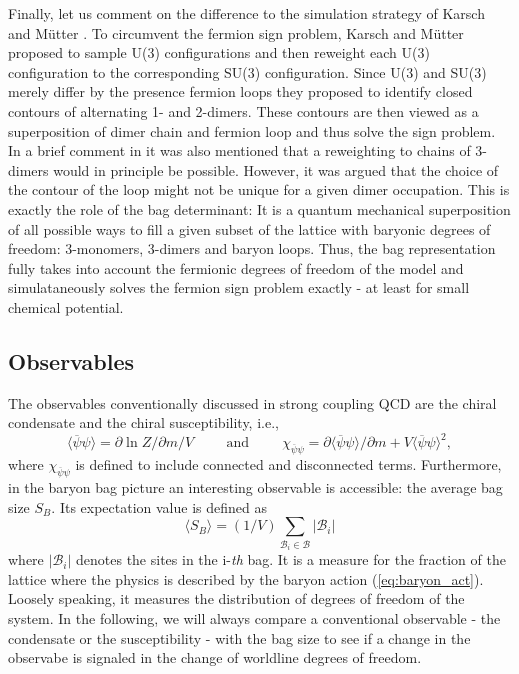\documentclass{PoS}
\begin{document}
Finally, let us comment on the difference to the simulation strategy of Karsch and M\"utter \cite{Karsch:1988zx}. To circumvent the fermion sign problem, Karsch and M\"utter proposed to sample U(3) configurations and then reweight each U(3) configuration to the corresponding SU(3) configuration. Since U(3) and SU(3) merely differ by the presence fermion loops they proposed to identify closed contours of alternating 1- and 2-dimers. These contours are then viewed as a superposition of dimer chain and fermion loop and thus solve the sign problem. In a brief comment in \cite{Karsch:1988zx} it was also mentioned that a reweighting to chains of 3-dimers would in principle be possible. However, it was argued that the choice of the contour of the loop might not be unique for a given dimer occupation. This is exactly the role of the bag determinant: It is a quantum mechanical superposition of all possible ways to fill a given subset of the lattice with baryonic degrees of freedom: 3-monomers, 3-dimers and baryon loops. Thus, the bag representation fully takes into account the fermionic degrees of freedom of the model and simulataneously solves the fermion sign problem exactly - at least for small chemical potential.

\subsection{Observables}

The observables conventionally discussed in strong coupling QCD are the chiral condensate and the chiral susceptibility, i.e.,
\begin{equation}
\langle \overline{\psi}\psi \rangle = \partial \ln Z/\partial m / V \hspace{1cm} \text{and} \hspace{1cm} \chi_{\overline{\psi}\psi} = \partial \langle\overline{\psi}\psi\rangle/\partial m + V\langle \overline{\psi}\psi \rangle^2,
\end{equation}
where $ \chi_{\overline{\psi}\psi}$ is defined to include connected and disconnected terms. Furthermore, in the baryon bag picture an interesting observable is accessible: the average bag size $S_B$. Its expectation value is defined as
\begin{equation}
\langle S_B \rangle = (1/V) \sum_{\mathcal{B}_i \in \mathcal{B}} |\mathcal{B}_i|
\end{equation}
where $|\mathcal{B}_i|$ denotes the sites in the i-\textit{th} bag. It is a measure for the fraction of the lattice where the physics is described by the baryon action (\ref{eq:baryon_act}). Loosely speaking, it measures the distribution of degrees of freedom of the system. In the following, we will always compare a conventional observable - the condensate or the susceptibility - with the bag size to see if a change in the observabe is signaled in the change of worldline degrees of freedom.
\end{document}
